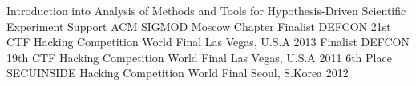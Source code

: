 \begin{cvhonors}
  \cvhonor
    {}
    {Introduction into Analysis of Methods and Tools for Hypothesis-Driven Scientific Experiment Support}
    {}
    {ACM SIGMOD Moscow Chapter}
  \cvhonor
    {Finalist}
    {DEFCON 21st CTF Hacking Competition World Final}
    {Las Vegas, U.S.A}
    {2013}
  \cvhonor
    {Finalist}
    {DEFCON 19th CTF Hacking Competition World Final}
    {Las Vegas, U.S.A}
    {2011}
  \cvhonor
    {6th Place}
    {SECUINSIDE Hacking Competition World Final}
    {Seoul, S.Korea}
    {2012}
\end{cvhonors}
